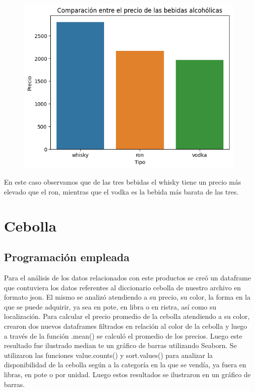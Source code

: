 \documentclass[a4paper,12pt]{article}
\begin{document}
			\begin{figure}[h]
			\centering
			\includegraphics[width=12cm]{comparation.png}
			\label{fig:Comparación de precios}
		\end{figure}
		
	En este caso observamos que de las tres bebidas el whisky tiene un precio más elevado
	que el ron, mientras que el vodka es la bebida más barata de las tres.
	
	\section{Cebolla}
		\subsection{Programación empleada}
		Para el análisis de los datos relacionados con este productos se creó un dataframe que contuviera los datos referentes al diccionario cebolla de nuestro archivo en formato json. El mismo se analizó atendiendo a su precio, su color, la forma en la que se puede adquirir, ya sea en pote, en libra o en ristra, así como su localización. Para calcular el precio promedio de la cebolla atendiendo a su color, crearon dos nuevos dataframes filtrados en relación al color de la cebolla y luego a través de la función .mean() se calculó el promedio de los precios. Luego este resultado fue ilustrado median te un gráfico de barras utilizando Seaborn. Se utilizaron las funciones value.counts() y sort.values() para analizar la disponibilidad de la cebolla según a la categoría en la que se vendía, ya fuera en libras, en pote o por unidad. Luego estos resultados se ilustraron en un gráfico de barras.
\end{document}
